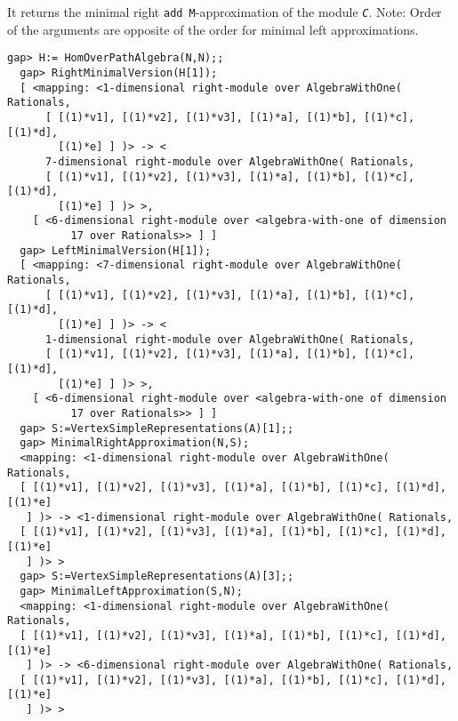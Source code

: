 \documentclass[a4paper,11pt]{report}
\begin{document}
{{{ It returns the minimal right \texttt{add M}-approximation of the module \mbox{\texttt{\slshape C}}. Note: Order of the arguments are opposite of the order for minimal left
approximations. }

 
\begin{Verbatim}[fontsize=\small,frame=single,label=Example]
  gap> H:= HomOverPathAlgebra(N,N);;
  gap> RightMinimalVersion(H[1]);   
  [ <mapping: <1-dimensional right-module over AlgebraWithOne( Rationals, 
      [ [(1)*v1], [(1)*v2], [(1)*v3], [(1)*a], [(1)*b], [(1)*c], [(1)*d], 
        [(1)*e] ] )> -> <
      7-dimensional right-module over AlgebraWithOne( Rationals, 
      [ [(1)*v1], [(1)*v2], [(1)*v3], [(1)*a], [(1)*b], [(1)*c], [(1)*d], 
        [(1)*e] ] )> >, 
    [ <6-dimensional right-module over <algebra-with-one of dimension 
          17 over Rationals>> ] ]
  gap> LeftMinimalVersion(H[1]);             
  [ <mapping: <7-dimensional right-module over AlgebraWithOne( Rationals, 
      [ [(1)*v1], [(1)*v2], [(1)*v3], [(1)*a], [(1)*b], [(1)*c], [(1)*d], 
        [(1)*e] ] )> -> <
      1-dimensional right-module over AlgebraWithOne( Rationals, 
      [ [(1)*v1], [(1)*v2], [(1)*v3], [(1)*a], [(1)*b], [(1)*c], [(1)*d], 
        [(1)*e] ] )> >, 
    [ <6-dimensional right-module over <algebra-with-one of dimension 
          17 over Rationals>> ] ]
  gap> S:=VertexSimpleRepresentations(A)[1];;
  gap> MinimalRightApproximation(N,S);
  <mapping: <1-dimensional right-module over AlgebraWithOne( Rationals, 
  [ [(1)*v1], [(1)*v2], [(1)*v3], [(1)*a], [(1)*b], [(1)*c], [(1)*d], [(1)*e] 
   ] )> -> <1-dimensional right-module over AlgebraWithOne( Rationals, 
  [ [(1)*v1], [(1)*v2], [(1)*v3], [(1)*a], [(1)*b], [(1)*c], [(1)*d], [(1)*e] 
   ] )> >
  gap> S:=VertexSimpleRepresentations(A)[3];;
  gap> MinimalLeftApproximation(S,N);        
  <mapping: <1-dimensional right-module over AlgebraWithOne( Rationals, 
  [ [(1)*v1], [(1)*v2], [(1)*v3], [(1)*a], [(1)*b], [(1)*c], [(1)*d], [(1)*e] 
   ] )> -> <6-dimensional right-module over AlgebraWithOne( Rationals, 
  [ [(1)*v1], [(1)*v2], [(1)*v3], [(1)*a], [(1)*b], [(1)*c], [(1)*d], [(1)*e] 
   ] )> >
\end{Verbatim}
 

}}
\end{document}
